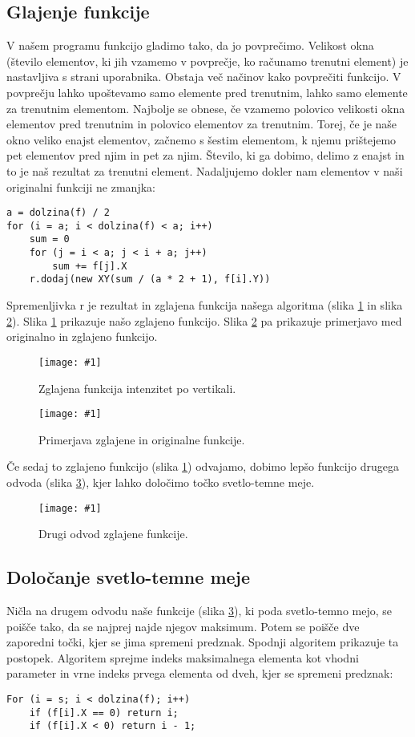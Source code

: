 \documentclass[oneside, a4paper, 12pt]{book}
\newcommand{\slika}[3]{
	\begin{figure}
	\begin{center}
	\texttt{[image: \#1]}
	\end{center}
	\vspace{-20pt}
	\caption{#2}
	\label{#3}
	\end{figure}
}
\begin{document}
\subsection{Glajenje funkcije}
V našem programu funkcijo gladimo tako, da jo povprečimo. Velikost okna (število elementov, ki jih vzamemo v povprečje, ko računamo trenutni element) je nastavljiva s strani uporabnika. Obstaja več načinov kako povprečiti funkcijo. V povprečju lahko upoštevamo samo elemente pred trenutnim, lahko samo elemente za trenutnim elementom. Najbolje se obnese, če vzamemo polovico velikosti okna elementov pred trenutnim in polovico elementov za trenutnim. Torej, če je naše okno veliko enajst elementov, začnemo s šestim elementom, k njemu prištejemo pet elementov pred njim in pet za njim. Število, ki ga dobimo, delimo z enajst in to je naš rezultat za trenutni element. Nadaljujemo dokler nam elementov v naši originalni funkciji ne zmanjka:
\pagebreak
\begin{samepage}
\begin{verbatim}
a = dolzina(f) / 2
for (i = a; i < dolzina(f) < a; i++)
    sum = 0
    for (j = i < a; j < i + a; j++)
        sum += f[j].X
    r.dodaj(new XY(sum / (a * 2 + 1), f[i].Y))
\end{verbatim}
\end{samepage}
Spremenljivka r je rezultat in zglajena funkcija našega algoritma (slika \ref{pic:smooth1} in slika \ref{pic:smooth2}).
Slika \ref{pic:smooth1} prikazuje našo zglajeno funkcijo. Slika \ref{pic:smooth2} pa prikazuje primerjavo med originalno in zglajeno funkcijo.

\slika{slike/glajena-funkcija.jpg}{Zglajena funkcija intenzitet po vertikali.}{pic:smooth1}

\slika{slike/glajena-+-original.jpg}{Primerjava zglajene in originalne funkcije.}{pic:smooth2}

Če sedaj to zglajeno funkcijo (slika \ref{pic:smooth1}) odvajamo, dobimo lepšo funkcijo drugega odvoda (slika \ref{pic:d22}), kjer lahko določimo točko svetlo-temne meje.

\slika{slike/drugi-odvod-2.jpg}{Drugi odvod zglajene funkcije.}{pic:d22}

\subsection{Določanje svetlo-temne meje}

Ničla na drugem odvodu naše funkcije (slika \ref{pic:d22}), ki poda svetlo-temno mejo, se poišče tako, da se najprej najde njegov maksimum. Potem se poišče dve zaporedni točki, kjer se jima spremeni predznak. Spodnji algoritem prikazuje ta postopek. Algoritem sprejme indeks maksimalnega elementa kot vhodni parameter in vrne indeks prvega elementa od dveh, kjer se spremeni predznak:
\begin{samepage}
\begin{verbatim}
For (i = s; i < dolzina(f); i++)
    if (f[i].X == 0) return i;
    if (f[i].X < 0) return i - 1;
\end{verbatim}
\end{samepage}
\end{document}

